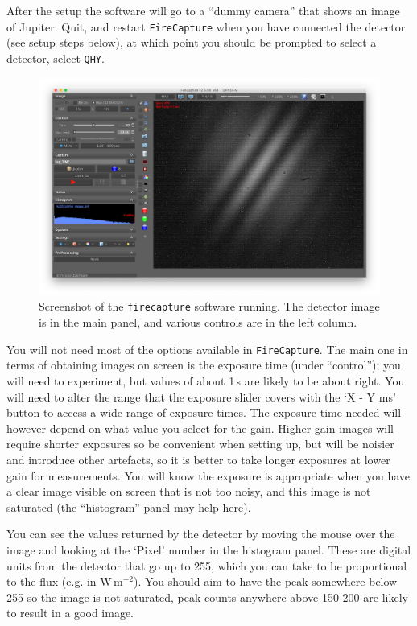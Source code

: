 \documentclass[11pt]{article}
\begin{document}
After the setup the software will go to a ``dummy camera'' that shows an image of Jupiter. Quit, and restart \texttt{FireCapture} when you have connected the detector (see setup steps below), at which point you should be prompted to select a detector, select \texttt{QHY}.

\begin{figure}[h]
    \centering
    \includegraphics[width=1\textwidth]{doc/fc.png}
    \caption{Screenshot of the \texttt{firecapture} software running. The detector image is in the main panel, and various controls are in the left column.}
    \label{fig:fc}
\end{figure}

You will not need most of the options available in \texttt{FireCapture}. The main one in terms of obtaining images on screen is the exposure time (under ``control''); you will need to experiment, but values of about 1\,s are likely to be about right. You will need to alter the range that the exposure slider covers with the `X - Y ms' button to access a wide range of exposure times. The exposure time needed will however depend on what value you select for the gain. Higher gain images will require shorter exposures so be convenient when setting up, but will be noisier and introduce other artefacts, so it is better to take longer exposures at lower gain for measurements. You will know the exposure is appropriate when you have a clear image visible on screen that is not too noisy, and this image is not saturated (the ``histogram'' panel may help here).

You can see the values returned by the detector by moving the mouse over the image and looking at the `Pixel' number in the histogram panel. These are digital units from the detector that go up to 255, which you can take to be proportional to the flux (e.g. in W\,m$^{-2}$). You should aim to have the peak somewhere below 255 so the image is not saturated, peak counts anywhere above 150-200 are likely to result in a good image.
\end{document}
